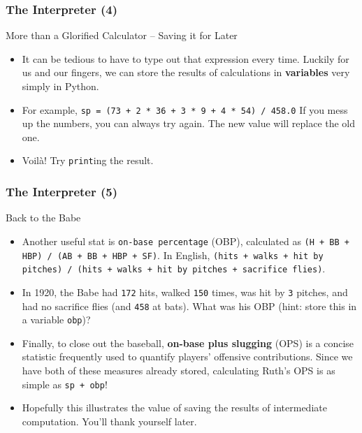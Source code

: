 \documentclass[10pt]{beamer}
\begin{document}
\begin{frame}
  \frametitle{The Interpreter (4)}
  \begin{block}{More than a Glorified Calculator -- Saving it for Later}
    \begin{itemize}
      \item It can be tedious to have to type out that expression every time.
        Luckily for us and our fingers, we can store the results of calculations in \textbf{variables} very simply in Python.
      \item For example, \texttt{sp = (73 + 2 * 36 + 3 * 9 + 4 * 54) / 458.0}
        If you mess up the numbers, you can always try again.
        The new value will replace the old one.
      \item Voil\`{a}! Try \texttt{print}ing the result.
    \end{itemize}
  \end{block}
\end{frame}


\begin{frame}
  \frametitle{The Interpreter (5)}
  \begin{block}{Back to the Babe}
    \begin{itemize}
      \item Another useful stat is \texttt{on-base percentage} (OBP), calculated as \texttt{(H + BB + HBP) / (AB + BB + HBP + SF)}.  
        In English, \texttt{(hits + walks + hit by pitches) / (hits + walks + hit by pitches + sacrifice flies)}.
      \item In 1920, the Babe had \texttt{172} hits, walked \texttt{150} times, was hit by \texttt{3} pitches, and had no sacrifice flies (and \texttt{458} at bats).
        What was his OBP (hint: store this in a variable \texttt{obp})?
      \item Finally, to close out the baseball, \textbf{on-base plus slugging} (OPS) is a concise statistic frequently used to quantify players' offensive contributions.
        Since we have both of these measures already stored, calculating Ruth's OPS is as simple as \texttt{sp + obp}!
      \item Hopefully this illustrates the value of saving the results of intermediate computation.
        You'll thank yourself later.
    \end{itemize}
  \end{block}
\end{frame}
\end{document}
